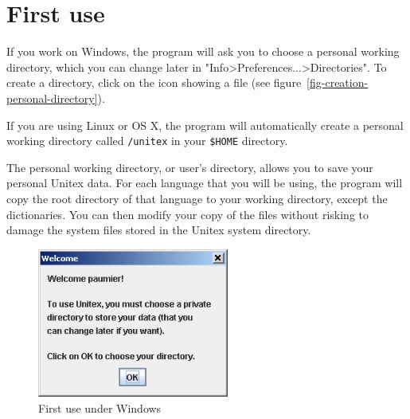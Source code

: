 








\section{First use}
\label{section-first-use}
If you work on Windows, the program will ask you to choose a
 personal working  directory, which you can
change later in "Info>Preferences...>Directories". To create a directory, click
on the icon showing a file (see
figure~\ref{fig-creation-personal-directory}).

\bigskip
\noindent If you are using Linux or OS X, the program will automatically create a
personal working directory called \verb+/unitex+ in your \verb+$HOME+ directory.

\bigskip
\noindent The personal working directory, or user's directory, allows
you to save your personal Unitex data. For each language that you will be using, the
program will copy the root directory of that language to your working
directory, except the dictionaries. You can then modify your copy of the
files without risking to damage the system files stored in the
Unitex system directory.

\begin{figure}[!ht]
\begin{center}
\includegraphics[width=6.3cm]{resources/img/fig1-1.png}
\caption{First use under Windows}
\end{center}
\end{figure}

